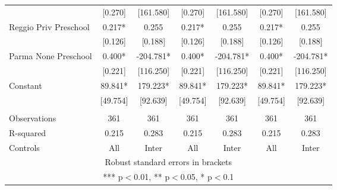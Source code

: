 \begin{tabular}{lcccccc}
 & [0.270] & [161.580] & [0.270] & [161.580] & [0.270] & [161.580] \\
Reggio Priv Preschool & 0.217* & 0.255 & 0.217* & 0.255 & 0.217* & 0.255 \\
 & [0.126] & [0.188] & [0.126] & [0.188] & [0.126] & [0.188] \\
Parma None Preschool & 0.400* & -204.781* & 0.400* & -204.781* & 0.400* & -204.781* \\
 & [0.221] & [116.250] & [0.221] & [116.250] & [0.221] & [116.250] \\
Constant & 89.841* & 179.223* & 89.841* & 179.223* & 89.841* & 179.223* \\
 & [49.754] & [92.639] & [49.754] & [92.639] & [49.754] & [92.639] \\
 &  &  &  &  &  &  \\
Observations & 361 & 361 & 361 & 361 & 361 & 361 \\
R-squared & 0.215 & 0.283 & 0.215 & 0.283 & 0.215 & 0.283 \\
 Controls & All & Inter & All & Inter & All & Inter \\ \hline
\multicolumn{7}{c}{ Robust standard errors in brackets} \\
\multicolumn{7}{c}{ *** p$<$0.01, ** p$<$0.05, * p$<$0.1} \\
\end{tabular}
